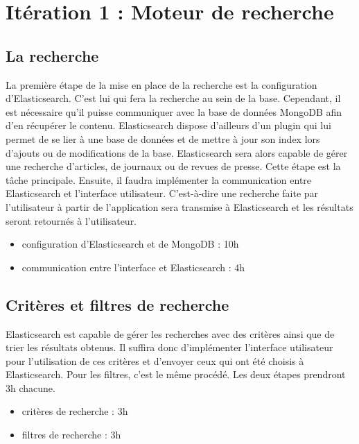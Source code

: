 \section{Itération 1 : Moteur de recherche}
\label{sec:moteur_rech}
	\subsection{La recherche} 
	\label{subsec:recherche}
		La première étape de la mise en place de la recherche est la configuration d'Elasticsearch. C'est lui qui fera la recherche au sein de la base. Cependant, il est nécessaire qu'il puisse communiquer avec la base de données MongoDB afin d'en récupérer le contenu. Elasticsearch dispose d'ailleurs d'un plugin qui lui permet de se lier à une base de données et de mettre à jour son index lors d'ajouts ou de modifications de la base. Elasticsearch sera alors capable de gérer une recherche d'articles, de journaux ou de revues de presse. Cette étape est la tâche principale. Ensuite, il faudra implémenter la communication entre Elasticsearch et l'interface utilisateur. C'est-à-dire une recherche faite par l'utilisateur à partir de l'application sera transmise à Elasticsearch et les résultats seront retournés à l'utilisateur.

		\begin{itemize}
			\item configuration d'Elasticsearch et de MongoDB : 10h
			\item communication entre l'interface et Elasticsearch : 4h
		\end{itemize}

	\subsection{Critères et filtres de recherche} 
	\label{subsec:crit_filtre}
		Elasticsearch est capable de gérer les recherches avec des critères ainsi que de trier les résultats obtenus. Il suffira donc d'implémenter l'interface utilisateur pour l'utilisation de ces critères et d'envoyer ceux qui ont été choisis à Elasticsearch. Pour les filtres, c'est le même procédé. Les deux étapes prendront 3h chacune.

		\begin{itemize}
			\item critères de recherche : 3h
			\item filtres de recherche : 3h
		\end{itemize}

